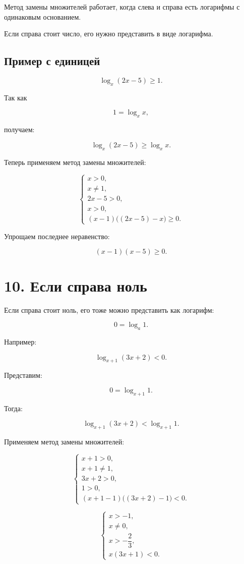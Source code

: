 \documentclass[a4paper,12pt]{article}
\begin{document}
Метод замены множителей работает, когда слева и справа есть логарифмы с одинаковым основанием.

Если справа стоит число, его нужно представить в виде логарифма.

\subsection*{Пример с единицей}

\[
\log_x(2x-5)\ge1.
\]

Так как

\[
1=\log_x x,
\]

получаем:

\[
\log_x(2x-5)\ge\log_x x.
\]

Теперь применяем метод замены множителей:

\[
\begin{cases}
x>0,\\
x\ne1,\\
2x-5>0,\\
x>0,\\
(x-1)\bigl((2x-5)-x\bigr)\ge0.
\end{cases}
\]

Упрощаем последнее неравенство:

\[
(x-1)(x-5)\ge0.
\]

\section*{10. Если справа ноль}

Если справа стоит ноль, его тоже можно представить как логарифм:

\[
0=\log_a1.
\]

Например:

\[
\log_{x+1}(3x+2)<0.
\]

Представим:

\[
0=\log_{x+1}1.
\]

Тогда:

\[
\log_{x+1}(3x+2)<\log_{x+1}1.
\]

Применяем метод замены множителей:

\[
\begin{cases}
x+1>0,\\
x+1\ne1,\\
3x+2>0,\\
1>0,\\
(x+1-1)\bigl((3x+2)-1\bigr)<0.
\end{cases}
\]

\[
\begin{cases}
x>-1,\\
x\ne0,\\
x>-\dfrac23,\\
x(3x+1)<0.
\end{cases}
\]
\end{document}
